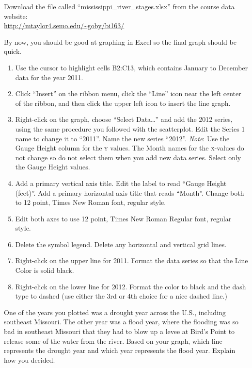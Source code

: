 \documentclass[12pt, hidelinks]{exam}
\newcommand*\AnswerBox[2]{%
	\parbox[t][#1]{0.92\textwidth}{%
		\begin{solution}#2\end{solution}
		\vskip\stretch{1}}
}
\begin{document}
\begin{questions}
\bigskip

Download the file called “mississippi\_river\_stages.xlsx” from the course data website:\\ \url{http://mtaylor4.semo.edu/~goby/bi163/}

By now, you should be good at graphing in Excel so the final graph should be quick.

\begin{enumerate}
	\item Use the cursor to highlight cells {\liningnum B2:C13}, which contains January to December data for the year 2011.

	\item Click “Insert” on the ribbon menu, click the “Line” icon near the left center of the ribbon, and then click the upper left icon to insert the line graph.

	\item Right-click on the graph, choose “Select Data\dots” and add the 2012 series, using the same procedure you followed with the scatterplot. Edit the Series 1 name to change it to “2011”. Name the new series “2012”. \emph{Note}: Use the Gauge Height column for the \textsc{y} values. The Month names for the \textsc{x}-values do not change so do not select them when you add new data series. Select only the Gauge Height values.

	\item Add a primary vertical axis title. Edit the label to read “Gauge Height (feet)”. Add a primary horizontal axis title that reads “Month”. Change both to 12 point, Times New Roman font, regular style.

	\item Edit both axes to use 12 point, Times New Roman Regular font, regular style.

	\item Delete the symbol legend. Delete any horizontal and vertical grid lines.

	\item Right-click on the upper line for 2011. Format the data series so that the Line Color is solid black.

	\item Right-click on the lower line for 2012. Format the color to black and the dash type to dashed (use either the 3rd or 4th choice for a nice dashed line.)
\end{enumerate}

\question
One of the years you plotted was a drought year across the U.S., including southeast Missouri. The other year was a flood year, where the flooding was so bad in southeast Missouri that they had to blow up a levee at Bird's Point to release some of the water from the river. Based on your graph, which line represents the drought year and which year represents the flood year. Explain how you decided.


\end{questions}
\end{document}
